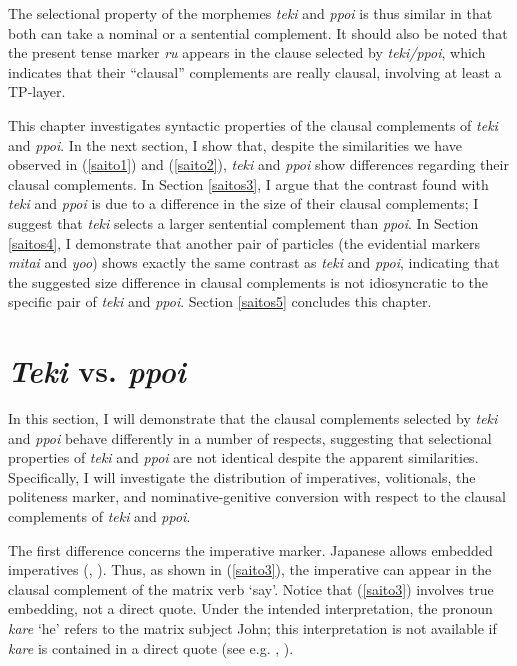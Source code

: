 \documentclass[output=paper]{langscibook}
\begin{document}
The selectional property of the morphemes \emph{teki} and \emph{ppoi} is thus similar in that both can take a nominal or a sentential complement. It should also be noted that the present tense marker \emph{ru} appears in the clause selected by \emph{teki/ppoi}, which indicates that their “clausal” complements are really clausal, involving at least a TP-layer.

This chapter investigates syntactic properties of the clausal complements of \emph{teki} and \emph{ppoi}. In the next section, I show that, despite the similarities we have observed in (\ref{saito1}) and (\ref{saito2}), \emph{teki} and \emph{ppoi} show differences regarding their clausal complements. In Section \ref{saitos3}, I argue that the contrast found with \emph{teki} and \emph{ppoi} is due to a difference in the size of their clausal complements; I suggest that \emph{teki} selects a larger sentential complement than \emph{ppoi}. In Section \ref{saitos4}, I demonstrate that another pair of particles (the evidential markers \emph{mitai} and \emph{yoo}) shows exactly the same contrast as \emph{teki} and \emph{ppoi}, indicating that the suggested size difference in clausal complements is not idiosyncratic to the specific pair of \emph{teki} and \emph{ppoi}. Section \ref{saitos5} concludes this chapter.



\section{\textit{Teki} vs. \textit{ppoi}} \label{saitos2}

In this section, I will demonstrate that the clausal complements selected by \emph{teki} and \emph{ppoi} behave differently in a number of respects, suggesting that selectional properties of \emph{teki} and \emph{ppoi} are not identical despite the apparent similarities. Specifically, I will investigate the distribution of imperatives, volitionals, the politeness marker, and nominative-genitive conversion with respect to the clausal complements of \emph{teki} and \emph{ppoi}.

The first difference concerns the imperative marker. Japanese allows embedded imperatives (\citealt{Oshima2006}, \citealt{Schwager2006}). Thus, as shown in (\ref{saito3}), the imperative can appear in the clausal complement of the matrix verb ‘say’. Notice that (\ref{saito3}) involves true embedding, not a direct quote. Under the intended interpretation, the pronoun \emph{kare} ‘he’ refers to the matrix subject John; this interpretation is not available if \emph{kare} is contained in a direct quote (see e.g. \citealt{anand2006}, \citealt{crnictrinh2009}).
\end{document}
